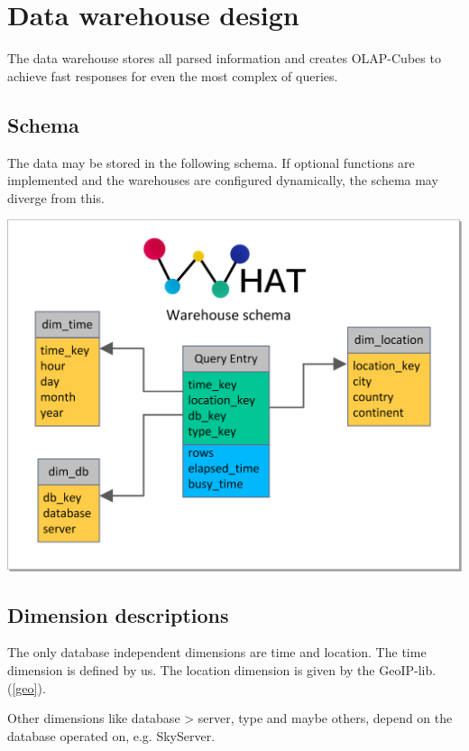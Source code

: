 \section{Data warehouse design}

The data warehouse stores all parsed information and creates OLAP-Cubes to achieve fast responses 
for even the most complex of queries.

\subsection{Schema}
The data may be stored in the following schema. If optional functions are implemented and
the warehouses are configured dynamically, the schema may diverge from this.
\begin{center}
\includegraphics[width=1\linewidth]{Pictures/WHSchema2.png}
\end{center} 

\newpage
\subsection{Dimension descriptions}
 The only database independent dimensions are time and location. The time dimension is defined by us. The location 
 dimension is given by the GeoIP-lib. (\ref{geo}). 
 
Other dimensions like database > server, type and maybe others,  
depend on the database operated on, e.g. SkyServer.


